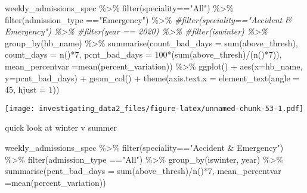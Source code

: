 \documentclass[
]{article}
\newenvironment{Shaded}{\begin{snugshade}}{\end{snugshade}}
\newcommand{\AttributeTok}[1]{\textcolor[rgb]{0.77,0.63,0.00}{#1}}
\newcommand{\CommentTok}[1]{\textcolor[rgb]{0.56,0.35,0.01}{\textit{#1}}}
\newcommand{\DecValTok}[1]{\textcolor[rgb]{0.00,0.00,0.81}{#1}}
\newcommand{\FunctionTok}[1]{\textcolor[rgb]{0.00,0.00,0.00}{#1}}
\newcommand{\NormalTok}[1]{#1}
\newcommand{\SpecialCharTok}[1]{\textcolor[rgb]{0.00,0.00,0.00}{#1}}
\newcommand{\StringTok}[1]{\textcolor[rgb]{0.31,0.60,0.02}{#1}}
\begin{document}
\begin{Shaded}
\begin{Highlighting}[]
\NormalTok{weekly\_admissions\_spec }\SpecialCharTok{\%\textgreater{}\%} 
  \FunctionTok{filter}\NormalTok{(speciality}\SpecialCharTok{==}\StringTok{"All"}\NormalTok{) }\SpecialCharTok{\%\textgreater{}\%} 
  \FunctionTok{filter}\NormalTok{(admission\_type }\SpecialCharTok{==}\StringTok{"Emergency"}\NormalTok{) }\SpecialCharTok{\%\textgreater{}\%} 
  \CommentTok{\#filter(speciality=="Accident \& Emergency") \%\textgreater{}\% }
  \CommentTok{\#filter(year == 2020) \%\textgreater{}\% }
  \CommentTok{\#filter(iswinter) \%\textgreater{}\%}
  \FunctionTok{group\_by}\NormalTok{(hb\_name) }\SpecialCharTok{\%\textgreater{}\%} 
  \FunctionTok{summarise}\NormalTok{(}\AttributeTok{count\_bad\_days =} \FunctionTok{sum}\NormalTok{(above\_thresh), }
            \AttributeTok{count\_days =} \FunctionTok{n}\NormalTok{()}\SpecialCharTok{*}\DecValTok{7}\NormalTok{, }
            \AttributeTok{pcnt\_bad\_days =} \DecValTok{100}\SpecialCharTok{*}\NormalTok{(}\FunctionTok{sum}\NormalTok{(above\_thresh)}\SpecialCharTok{/}\NormalTok{(}\FunctionTok{n}\NormalTok{()}\SpecialCharTok{*}\DecValTok{7}\NormalTok{)), }
            \AttributeTok{mean\_percentvar =}\FunctionTok{mean}\NormalTok{(percent\_variation)) }\SpecialCharTok{\%\textgreater{}\%}
  \FunctionTok{ggplot}\NormalTok{() }\SpecialCharTok{+}
  \FunctionTok{aes}\NormalTok{(}\AttributeTok{x=}\NormalTok{hb\_name, }\AttributeTok{y=}\NormalTok{pcnt\_bad\_days) }\SpecialCharTok{+}
  \FunctionTok{geom\_col}\NormalTok{() }\SpecialCharTok{+}
  \FunctionTok{theme}\NormalTok{(}\AttributeTok{axis.text.x =} \FunctionTok{element\_text}\NormalTok{(}\AttributeTok{angle =} \DecValTok{45}\NormalTok{, }\AttributeTok{hjust =} \DecValTok{1}\NormalTok{))}
\end{Highlighting}
\end{Shaded}

\texttt{[image: investigating\_data2\_files/figure-latex/unnamed-chunk-53-1.pdf]}

quick look at winter v summer

\begin{Shaded}
\begin{Highlighting}[]
\NormalTok{weekly\_admissions\_spec }\SpecialCharTok{\%\textgreater{}\%} 
  \FunctionTok{filter}\NormalTok{(speciality}\SpecialCharTok{==}\StringTok{"Accident \& Emergency"}\NormalTok{) }\SpecialCharTok{\%\textgreater{}\%} 
  \FunctionTok{filter}\NormalTok{(admission\_type }\SpecialCharTok{==}\StringTok{"All"}\NormalTok{) }\SpecialCharTok{\%\textgreater{}\%} 
  \FunctionTok{group\_by}\NormalTok{(iswinter, year) }\SpecialCharTok{\%\textgreater{}\%} 
  \FunctionTok{summarise}\NormalTok{(}\AttributeTok{pcnt\_bad\_days =} \FunctionTok{sum}\NormalTok{(above\_thresh)}\SpecialCharTok{/}\FunctionTok{n}\NormalTok{()}\SpecialCharTok{*}\DecValTok{7}\NormalTok{, }\AttributeTok{mean\_percentvar =}\FunctionTok{mean}\NormalTok{(percent\_variation)) }
\end{Highlighting}
\end{Shaded}
\end{document}
